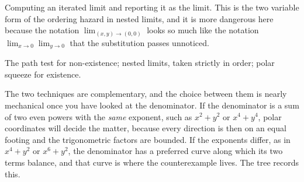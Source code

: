 \begin{trap}
Computing an iterated limit and reporting it as the limit. This is the two variable form of the ordering hazard in nested limits, and it is more dangerous here because the notation $\lim_{(x,y)\to(0,0)}$ looks so much like the notation $\lim_{x\to0}\lim_{y\to0}$ that the substitution passes unnoticed.
\end{trap}

\begin{seealsob}The path test for non-existence; nested limits, taken strictly in order; polar squeeze for existence.\end{seealsob}

The two techniques are complementary, and the choice between them is nearly mechanical once you have looked at the denominator. If the denominator is a sum of two even powers with the \emph{same} exponent, such as $x^{2}+y^{2}$ or $x^{4}+y^{4}$, polar coordinates will decide the matter, because every direction is then on an equal footing and the trigonometric factors are bounded. If the exponents differ, as in $x^{4}+y^{2}$ or $x^{6}+y^{2}$, the denominator has a preferred curve along which its two terms balance, and that curve is where the counterexample lives. The tree records this.

\begin{center}
\end{center}

